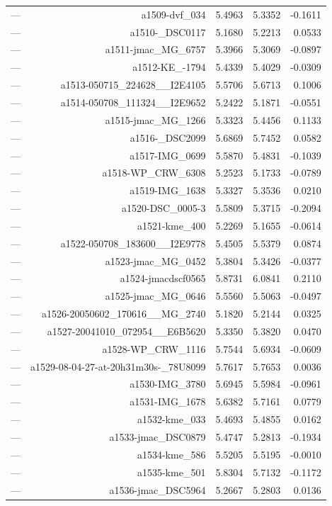 \begin{table}[htbp]
\begin{tabular}{lrrrr}
— & a1509-dvf_034 & 5.4963 & 5.3352 & -0.1611 \\
— & a1510-_DSC0117 & 5.1680 & 5.2213 & 0.0533 \\
— & a1511-jmac_MG_6757 & 5.3966 & 5.3069 & -0.0897 \\
— & a1512-KE_-1794 & 5.4339 & 5.4029 & -0.0309 \\
— & a1513-050715_224628__I2E4105 & 5.5706 & 5.6713 & 0.1006 \\
— & a1514-050708_111324__I2E9652 & 5.2422 & 5.1871 & -0.0551 \\
— & a1515-jmac_MG_1266 & 5.3323 & 5.4456 & 0.1133 \\
— & a1516-_DSC2099 & 5.6869 & 5.7452 & 0.0582 \\
— & a1517-IMG_0699 & 5.5870 & 5.4831 & -0.1039 \\
— & a1518-WP_CRW_6308 & 5.2523 & 5.1733 & -0.0789 \\
— & a1519-IMG_1638 & 5.3327 & 5.3536 & 0.0210 \\
— & a1520-DSC_0005-3 & 5.5809 & 5.3715 & -0.2094 \\
— & a1521-kme_400 & 5.2269 & 5.1655 & -0.0614 \\
— & a1522-050708_183600__I2E9778 & 5.4505 & 5.5379 & 0.0874 \\
— & a1523-jmac_MG_0452 & 5.3804 & 5.3426 & -0.0377 \\
— & a1524-jmacdscf0565 & 5.8731 & 6.0841 & 0.2110 \\
— & a1525-jmac_MG_0646 & 5.5560 & 5.5063 & -0.0497 \\
— & a1526-20050602_170616__MG_2740 & 5.1820 & 5.2144 & 0.0325 \\
— & a1527-20041010_072954__E6B5620 & 5.3350 & 5.3820 & 0.0470 \\
— & a1528-WP_CRW_1116 & 5.7544 & 5.6934 & -0.0609 \\
— & a1529-08-04-27-at-20h31m30s-_78U8099 & 5.7617 & 5.7653 & 0.0036 \\
— & a1530-IMG_3780 & 5.6945 & 5.5984 & -0.0961 \\
— & a1531-IMG_1678 & 5.6382 & 5.7161 & 0.0779 \\
— & a1532-kme_033 & 5.4693 & 5.4855 & 0.0162 \\
— & a1533-jmac_DSC0879 & 5.4747 & 5.2813 & -0.1934 \\
— & a1534-kme_586 & 5.5205 & 5.5195 & -0.0010 \\
— & a1535-kme_501 & 5.8304 & 5.7132 & -0.1172 \\
— & a1536-jmac_DSC5964 & 5.2667 & 5.2803 & 0.0136 \\

\end{tabular}
\end{table}
